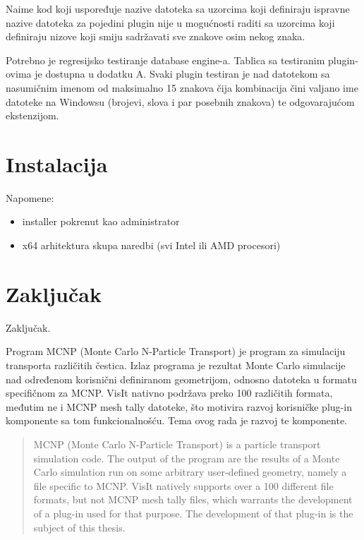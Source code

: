 \documentclass[times, utf8, zavrsni]{fer}
\begin{document}
Naime kod koji uspoređuje nazive datoteka sa uzorcima koji definiraju ispravne nazive datoteka za pojedini plugin nije u mogućnosti raditi sa uzorcima koji definiraju nizove koji smiju sadržavati sve znakove osim nekog znaka.

Potrebno je regresijsko testiranje database engine-a.
Tablica sa testiranim plugin-ovima je dostupna u dodatku A.
Svaki plugin testiran je nad datotekom sa nasumičnim imenom od maksimalno 15 znakova čija kombinacija čini valjano ime datoteke na Windowsu (brojevi, slova i par posebnih znakova) te odgovarajućom ekstenzijom.


\chapter{Instalacija}
Napomene:
\begin{itemize}
	\item installer pokrenut kao administrator
	\item x64 arhitektura skupa naredbi (svi Intel ili AMD procesori)
\end{itemize}



\chapter{Zaključak}
Zaključak.




\begin{sazetak}
Program MCNP (Monte Carlo N-Particle Transport) je program za simulaciju transporta različitih čestica.
Izlaz programa je rezultat Monte Carlo simulacije nad određenom korisnični definiranom geometrijom, odnosno datoteka u formatu specifičnom za MCNP.
VisIt nativno podržava preko 100 različitih formata, međutim ne i MCNP mesh tally datoteke, što motivira razvoj korisničke plug-in komponente sa tom funkcionalnošću.
Tema ovog rada je razvoj te komponente.

\end{sazetak}

\begin{abstract}
MCNP (Monte Carlo N-Particle Transport) is a particle transport simulation code.
The output of the program are the results of a Monte Carlo simulation run on some arbitrary user-defined geometry, namely a file specific to MCNP.
VisIt natively supports over a 100 different file formats, but not MCNP mesh tally files, which warrants the development of a plug-in used for that purpose.
The development of that plug-in is the subject of this thesis. 

\end{abstract}
\end{document}
